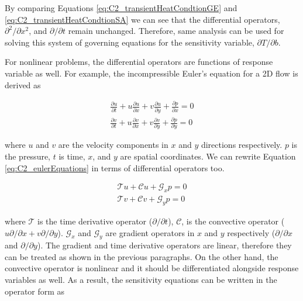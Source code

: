 By comparing Equations \eqref{eq:C2_transientHeatCondtionGE} and \eqref{eq:C2_transientHeatCondtionSA} we can see that the differential operators, $\partial^2 /\partial x^2$, and $\partial /\partial t$ remain unchanged. Therefore, same analysis can be used for solving this system of governing equations for the sensitivity variable, $\partial T/\partial b$.

For nonlinear problems, the differential operators are functions of response variable as well. For example, the incompressible Euler's equation for a 2D flow is derived as

\begin{subequations}\label{eq:C2_eulerEquations}
\begin{gather}
	\frac{\partial u}{\partial t} +
	u \frac{\partial u}{\partial x} + v \frac{\partial u}{\partial y} +
	\frac{\partial p}{\partial x} = 0 
	\\
	\frac{\partial v}{\partial t} +
	u \frac{\partial v}{\partial x} + v \frac{\partial v}{\partial y} +
	\frac{\partial p}{\partial y} = 0
\end{gather}
\end{subequations}

where $u$ and $v$ are the velocity components in $x$ and $y$ directions respectively. $p$ is the pressure, $t$ is time, $x$, and $y$ are spatial coordinates. We can rewrite Equation \eqref{eq:C2_eulerEquations} in terms of differential operators too.

\begin{subequations}
\begin{gather*}
	\mathcal{T} u +
	\mathcal{C} u +
	\mathcal{G}_x p = 0 
	\\
	\mathcal{T} v +
	\mathcal{C} v +
	\mathcal{G}_y p = 0 
\end{gather*}
\end{subequations}

where $\mathcal{T}$ is the time derivative operator ($\partial /\partial t$), $\mathcal{C}$, is the convective operator ($u \partial / \partial x + v \partial / \partial y$). $\mathcal{G}_x$ and $\mathcal{G}_y$ are gradient operators in $x$ and $y$ respectively ($\partial /\partial x$ and $\partial /\partial y$). The gradient and time derivative operators are linear, therefore they can be treated as shown in the previous paragraphs. On the other hand, the convective operator is nonlinear and it should be differentiated alongside response variables as well. As a result, the sensitivity equations can be written in the operator form as

